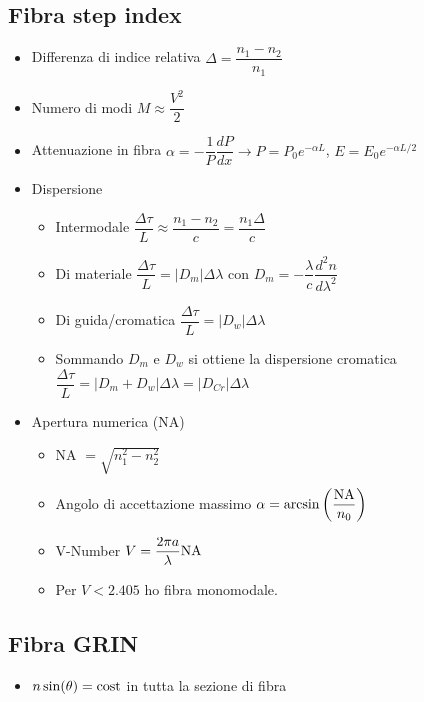 \documentclass{article}
\begin{document}
\subsection{Fibra step index}
\begin{itemize}
  \item Differenza di indice relativa \(  \Delta = \dfrac{n_1 - n_2}{n_1} \)
  \item Numero di modi \(  M \approx \dfrac{V^2}{2} \)
  \item Attenuazione in fibra \(  \alpha = - \dfrac{1}{P} \dfrac{dP}{dx} \rightarrow P = P_0 e^{-\alpha L}\), \(   E = E_0 e^{-\alpha L / 2} \)
  \item Dispersione
        \begin{itemize}
          \item Intermodale \(  \dfrac{\Delta \tau}{L} \approx \dfrac{n_1 - n_2}{c} = \dfrac{n_1 \Delta}{c} \)
          \item Di materiale \(  \dfrac{\Delta \tau}{L} = | D_m | \Delta \lambda \) con \( D_m = -\dfrac{\lambda}{c} \dfrac{d^2 n}{d \lambda^2} \)
          \item Di guida/cromatica \(  \dfrac{\Delta \tau}{L} = | D_w | \Delta \lambda \)
          \item Sommando \( D_m \) e \( D_w \) si ottiene la dispersione cromatica \( \dfrac{\Delta \tau}{L} = | D_m + D_w | \Delta \lambda = | D_{Cr} | \Delta \lambda \)
        \end{itemize}
  \item Apertura numerica (NA)
        \begin{itemize}
          \item NA \( \displaystyle = \sqrt{n_1^2 - n_2^2} \)
          \item Angolo di accettazione massimo \( \alpha = \arcsin \left( \dfrac{\textnormal{NA}}{n_0} \right) \)
          \item V-Number \( V = \dfrac{2 \pi a}{\lambda} \textnormal{NA} \)
          \item Per \( V < 2.405 \) ho fibra monomodale.
        \end{itemize}
\end{itemize}

\subsection{Fibra GRIN}
\begin{itemize}
  \item \( n \sin(\theta) = \textnormal{cost} \) in tutta la sezione di fibra
\end{itemize}
\end{document}
